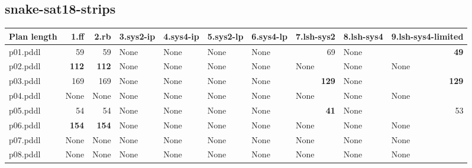 \documentclass{article}
\begin{document}
\hypertarget{plan_length-snake-sat18-strips}{}
\subsection*{snake-sat18-strips}

\begin{tabular}{@{}lrrrrrrrrr@{}}
Plan length & 1.ff & 2.rb & 3.sys2-ip & 4.sys4-ip & 5.sys2-lp & 6.sys4-lp & 7.lsh-sys2 & 8.lsh-sys4 & 9.lsh-sys4-limited \\
\midrule
p01.pddl & 59 & 59 & \multicolumn{1}{|l|}{None} & \multicolumn{1}{|l|}{None} & \multicolumn{1}{|l|}{None} & \multicolumn{1}{|l|}{None} & 69 & \multicolumn{1}{|l|}{None} & \textbf{49} \\
p02.pddl & \textbf{112} & \textbf{112} & \multicolumn{1}{|l|}{None} & \multicolumn{1}{|l|}{None} & \multicolumn{1}{|l|}{None} & \multicolumn{1}{|l|}{None} & \multicolumn{1}{|l|}{None} & \multicolumn{1}{|l|}{None} & \multicolumn{1}{|l|}{None} \\
p03.pddl & 169 & 169 & \multicolumn{1}{|l|}{None} & \multicolumn{1}{|l|}{None} & \multicolumn{1}{|l|}{None} & \multicolumn{1}{|l|}{None} & \textbf{129} & \multicolumn{1}{|l|}{None} & \textbf{129} \\
p04.pddl & \multicolumn{1}{|l|}{None} & \multicolumn{1}{|l|}{None} & \multicolumn{1}{|l|}{None} & \multicolumn{1}{|l|}{None} & \multicolumn{1}{|l|}{None} & \multicolumn{1}{|l|}{None} & \multicolumn{1}{|l|}{None} & \multicolumn{1}{|l|}{None} & \multicolumn{1}{|l|}{None} \\
p05.pddl & 54 & 54 & \multicolumn{1}{|l|}{None} & \multicolumn{1}{|l|}{None} & \multicolumn{1}{|l|}{None} & \multicolumn{1}{|l|}{None} & \textbf{41} & \multicolumn{1}{|l|}{None} & 53 \\
p06.pddl & \textbf{154} & \textbf{154} & \multicolumn{1}{|l|}{None} & \multicolumn{1}{|l|}{None} & \multicolumn{1}{|l|}{None} & \multicolumn{1}{|l|}{None} & \multicolumn{1}{|l|}{None} & \multicolumn{1}{|l|}{None} & \multicolumn{1}{|l|}{None} \\
p07.pddl & \multicolumn{1}{|l|}{None} & \multicolumn{1}{|l|}{None} & \multicolumn{1}{|l|}{None} & \multicolumn{1}{|l|}{None} & \multicolumn{1}{|l|}{None} & \multicolumn{1}{|l|}{None} & \multicolumn{1}{|l|}{None} & \multicolumn{1}{|l|}{None} & \multicolumn{1}{|l|}{None} \\
p08.pddl & \multicolumn{1}{|l|}{None} & \multicolumn{1}{|l|}{None} & \multicolumn{1}{|l|}{None} & \multicolumn{1}{|l|}{None} & \multicolumn{1}{|l|}{None} & \multicolumn{1}{|l|}{None} & \multicolumn{1}{|l|}{None} & \multicolumn{1}{|l|}{None} & \multicolumn{1}{|l|}{None} \\

\end{tabular}
\end{document}
